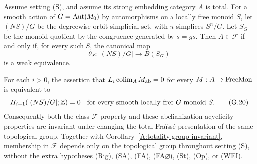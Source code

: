 \begin{theorem}
\label{G:groupcriterion}
Assume setting (S), and assume its strong embedding category $A$
is total. For a smooth action of $G=\operatorname{Aut}(M_0)$ by automorphisms
on a locally free monoid $S$, let $(NS)/G$ be the degreewise
orbit simplicial set, with $n$-simplices $S^n/G$. Let $S_G$ be
the monoid quotient by the congruence generated by $s=gs$.
Then $A\in\mathcal F$ if and only if, for every such $S$, the
canonical map
\[
 \theta_S: |(NS)/G|\longrightarrow B(S_G)
 \tag{G.19}
\]
is a weak equivalence.

For each $i>0$, the assertion that
$L_i\operatorname*{colim}_A M_{\mathrm{ab}}=0$ for every $M:A\to\mathrm{FreeMon}$ is
equivalent to
\[
 H_{i+1}(|(NS)/G|;\mathbb Z)=0
 \quad\text{for every smooth locally free }G\text{-monoid }S.
 \tag{G.20}
\]
Consequently both the class-$\mathcal F$ property and these
abelianization-acyclicity properties are invariant under changing
the total Fra\"iss\'e presentation of the same topological group.
Together with Corollary~\ref{A:totality-group-invariant}, membership
in $\mathcal F$ depends only on the topological group throughout
setting (S), without the extra hypotheses (Rig), (SA), (FA),
(FA$\varnothing$), (St), (Op), or (WEI).
\end{theorem}
